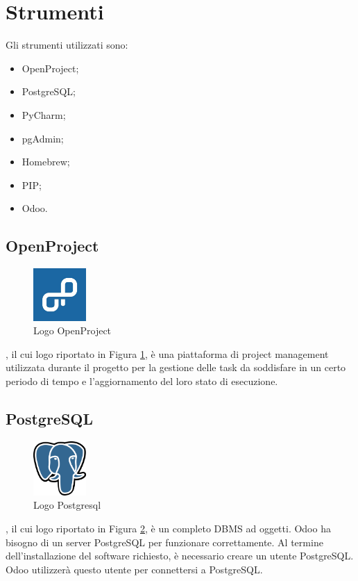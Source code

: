 \section{Strumenti}
Gli strumenti utilizzati sono:
\begin{itemize}
\item OpenProject;
\item PostgreSQL;
\item PyCharm;
\item pgAdmin;
\item Homebrew;
\item PIP;
\item Odoo.
\end{itemize}
\subsection{OpenProject}
\begin{figure}[H]
	\begin{center} \includegraphics[width=2cm]{figures/openproject}
		\caption[Logo OpenProject]{Logo OpenProject}  
		\label{openproject} 
	\end{center}
\end{figure}
, il cui logo riportato in Figura \ref{openproject}, è una piattaforma di project management utilizzata durante il progetto per la gestione delle task da soddisfare in un certo periodo di tempo e l'aggiornamento del loro stato di esecuzione.

\subsection{PostgreSQL}
\begin{figure}[H]
	\begin{center} \includegraphics[width=2cm]{figures/Logo_Postgresql}
		\caption[Logo Postgresql]{Logo Postgresql}  
		\label{logo_postgresql} 
	\end{center}
\end{figure}
, il cui logo riportato in Figura \ref{logo_postgresql}, è un completo DBMS ad oggetti. Odoo ha bisogno di un server PostgreSQL per funzionare correttamente. Al termine dell'installazione del software richiesto, è necessario creare un utente PostgreSQL. Odoo utilizzerà questo utente per connettersi a PostgreSQL.

